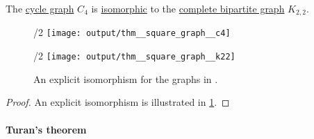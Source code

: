\begin{proposition}\label{thm:square_graph}
  The \hyperref[def:cycle_graph]{cycle graph} \( C_4 \) is \hyperref[def:undirected_graph/homomorphism]{isomorphic} to the \hyperref[def:complete_multipartite_graph]{complete bipartite graph} \( K_{2,2} \).

  \begin{figure}[!ht]
    \begin{subcaptionblock}{\textwidth/2}
      \centering
      \texttt{[image: output/thm\_\_square\_graph\_\_c4]}
      \caption{\( C_4 \)}\label{fig:thm:square_graph/c4}
    \end{subcaptionblock}
    \hfill
    \begin{subcaptionblock}{\textwidth/2}
      \centering
      \texttt{[image: output/thm\_\_square\_graph\_\_k22]}
      \caption{\( K_{2,2} \)}\label{fig:thm:square_graph/k22}
    \end{subcaptionblock}
    \caption{An explicit isomorphism for the graphs in .}\label{fig:thm:square_graph}
  \end{figure}
\end{proposition}
\begin{proof}
  An explicit isomorphism is illustrated in \cref{fig:thm:square_graph}.
\end{proof}

\paragraph{Turan's theorem}

